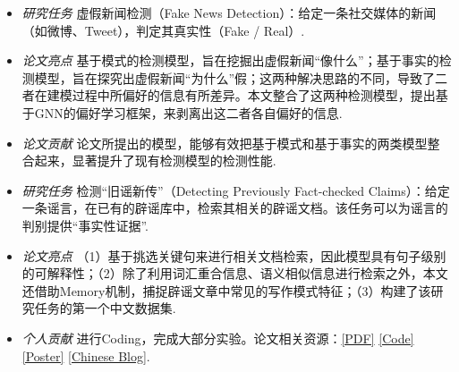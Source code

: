 \documentclass{resume}
\begin{document}
{\small {}
}
\small
\begin{itemize}
  \item \textit{研究任务} \quad 虚假新闻检测（Fake News Detection）：给定一条社交媒体的新闻（如微博、Tweet），判定其真实性（Fake / Real）.
  \item \textit{论文亮点} \quad 基于模式的检测模型，旨在挖掘出虚假新闻“像什么”；基于事实的检测模型，旨在探究出虚假新闻“为什么”假；这两种解决思路的不同，导致了二者在建模过程中所偏好的信息有所差异。本文整合了这两种检测模型，提出基于GNN的偏好学习框架，来剥离出这二者各自偏好的信息.
  \item \textit{论文贡献} \quad 论文所提出的模型，能够有效把基于模式和基于事实的两类模型整合起来，显著提升了现有检测模型的检测性能.
\end{itemize}

{\small {}}
\small
\begin{itemize}
  \item \textit{研究任务} \quad 检测“旧谣新传”（Detecting Previously Fact-checked Claims）：给定一条谣言，在已有的辟谣库中，检索其相关的辟谣文档。该任务可以为谣言的判别提供“事实性证据”.
  \item \textit{论文亮点} \quad （1）基于挑选关键句来进行相关文档检索，因此模型具有句子级别的可解释性；（2）除了利用词汇重合信息、语义相似信息进行检索之外，本文还借助Memory机制，捕捉辟谣文章中常见的写作模式特征；（3）构建了该研究任务的第一个中文数据集.
  \item \textit{个人贡献} \quad 进行Coding，完成大部分实验。论文相关资源：\href{https://aclanthology.org/2021.acl-long.425.pdf}{[PDF]} \href{https://github.com/ICTMCG/MTM}{[Code]} \href{https://www.zhangxueyao.com/data/acl2021-MTM-poster.pdf}{[Poster]} \href{https://zhuanlan.zhihu.com/p/393615707}{[Chinese Blog]}.
\end{itemize}
\end{document}
